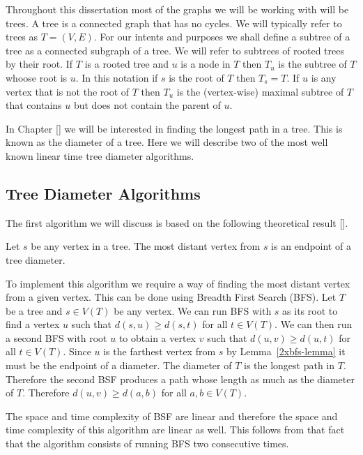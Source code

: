 Throughout this dissertation most of the graphs we will be working with will be trees. A tree is a connected graph that has no cycles. We will typically refer to trees as $T = (V, E)$. For our intents and purposes we shall define a subtree of a tree as a connected subgraph of a tree. We will refer to subtrees of rooted trees by their root. If $T$ is a rooted tree and $u$ is a node in $T$ then $T_u$ is the subtree of $T$ whoose root is $u$. In this notation if $s$ is the root of $T$ then $T_s = T$. If $u$ is any vertex that is not the root of $T$ then $T_u$ is the (vertex-wise) maximal subtree of $T$ that contains $u$ but does not contain the parent of $u$.


In Chapter [] we will be interested in finding the longest path in a tree. This is known as the diameter of a tree. Here we will  describe two of the most well known linear time tree diameter algorithms.

\subsection{Tree Diameter Algorithms}

The first algorithm we will discuss is based on the following theoretical result [].

\begin{lem} \label{2xbfs-lemma} Let $s$ be any vertex in a tree. The most distant vertex from $s$ is an endpoint of a tree diameter. \end{lem}

To implement this algorithm we require a way of finding the most distant vertex from a given vertex. This can be done using Breadth First Search (BFS). Let $T$ be a tree and $s \in V(T)$ be any vertex. We can run BFS with $s$ as its root to find a vertex $u$ such that $d(s, u) \ge d(s, t)$ for all $t \in V(T)$. We can then run a second BFS with root $u$ to obtain a vertex $v$ such that $d(u, v) \ge d(u, t)$ for all $t \in V(T)$. Since $u$ is the farthest vertex from $s$ by Lemma~\ref{2xbfs-lemma} it must be the endpoint of a diameter. The diameter of $T$ is the longest path in $T$. Therefore the second BSF produces a path whose length as much as the diameter of $T$. Therefore $d(u, v) \ge d(a, b)$ for all $a,b \in V(T)$.

The space and time complexity of BSF are linear \cite{intro-to-algo} and therefore the space and time complexity of this algorithm are linear as well. This follows from that fact that the algorithm consists of running BFS two consecutive times.


